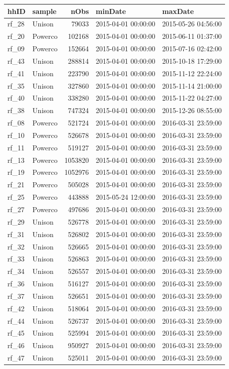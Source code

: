 \documentclass[]{article}
\begin{document}
\begin{longtable}[]{@{}llrll@{}}
\toprule
hhID & sample & nObs & minDate & maxDate\tabularnewline
\midrule
\endhead
rf\_28 & Unison & 79033 & 2015-04-01 00:00:00 & 2015-05-26
04:56:00\tabularnewline
rf\_20 & Powerco & 102168 & 2015-04-01 00:00:00 & 2015-06-11
01:37:00\tabularnewline
rf\_09 & Powerco & 152664 & 2015-04-01 00:00:00 & 2015-07-16
02:42:00\tabularnewline
rf\_43 & Unison & 288814 & 2015-04-01 00:00:00 & 2015-10-18
17:29:00\tabularnewline
rf\_41 & Unison & 223790 & 2015-04-01 00:00:00 & 2015-11-12
22:24:00\tabularnewline
rf\_35 & Unison & 327860 & 2015-04-01 00:00:00 & 2015-11-14
21:00:00\tabularnewline
rf\_40 & Unison & 338280 & 2015-04-01 00:00:00 & 2015-11-22
04:27:00\tabularnewline
rf\_38 & Unison & 747324 & 2015-04-01 00:00:00 & 2015-12-26
08:55:00\tabularnewline
rf\_08 & Powerco & 521724 & 2015-04-01 00:00:00 & 2016-03-31
23:59:00\tabularnewline
rf\_10 & Powerco & 526678 & 2015-04-01 00:00:00 & 2016-03-31
23:59:00\tabularnewline
rf\_11 & Powerco & 519127 & 2015-04-01 00:00:00 & 2016-03-31
23:59:00\tabularnewline
rf\_13 & Powerco & 1053820 & 2015-04-01 00:00:00 & 2016-03-31
23:59:00\tabularnewline
rf\_19 & Powerco & 1052976 & 2015-04-01 00:00:00 & 2016-03-31
23:59:00\tabularnewline
rf\_21 & Powerco & 505028 & 2015-04-01 00:00:00 & 2016-03-31
23:59:00\tabularnewline
rf\_25 & Powerco & 443888 & 2015-05-24 12:00:00 & 2016-03-31
23:59:00\tabularnewline
rf\_27 & Powerco & 497686 & 2015-04-01 00:00:00 & 2016-03-31
23:59:00\tabularnewline
rf\_29 & Unison & 526778 & 2015-04-01 00:00:00 & 2016-03-31
23:59:00\tabularnewline
rf\_31 & Unison & 526802 & 2015-04-01 00:00:00 & 2016-03-31
23:59:00\tabularnewline
rf\_32 & Unison & 526665 & 2015-04-01 00:00:00 & 2016-03-31
23:59:00\tabularnewline
rf\_33 & Unison & 526863 & 2015-04-01 00:00:00 & 2016-03-31
23:59:00\tabularnewline
rf\_34 & Unison & 526557 & 2015-04-01 00:00:00 & 2016-03-31
23:59:00\tabularnewline
rf\_36 & Unison & 516127 & 2015-04-01 00:00:00 & 2016-03-31
23:59:00\tabularnewline
rf\_37 & Unison & 526651 & 2015-04-01 00:00:00 & 2016-03-31
23:59:00\tabularnewline
rf\_42 & Unison & 518064 & 2015-04-01 00:00:00 & 2016-03-31
23:59:00\tabularnewline
rf\_44 & Unison & 526737 & 2015-04-01 00:00:00 & 2016-03-31
23:59:00\tabularnewline
rf\_45 & Unison & 525994 & 2015-04-01 00:00:00 & 2016-03-31
23:59:00\tabularnewline
rf\_46 & Unison & 950927 & 2015-04-01 00:00:00 & 2016-03-31
23:59:00\tabularnewline
rf\_47 & Unison & 525011 & 2015-04-01 00:00:00 & 2016-03-31
23:59:00\tabularnewline
\bottomrule
\end{longtable}
\end{document}
